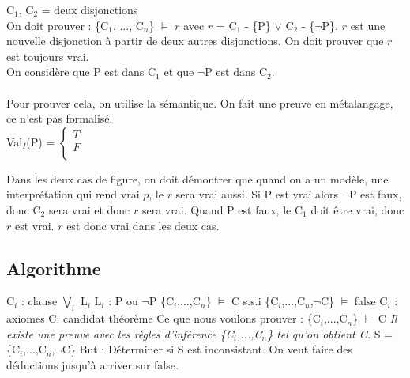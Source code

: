 \noindent C$_{1}$, C$_{2}$ = deux disjonctions \\

\noindent On doit prouver : \{C$_{1}$, ..., C$_{n}$\} $\models$ $r$ avec  $r$ = C$_{1}$ - \{P\} $\lor$ C$_{2}$ - \{$\lnot$P\}. $r$ est une nouvelle disjonction à partir de deux autres disjonctions. On doit prouver que $r$ est toujours vrai.\\

\noindent On considère que P est dans C$_{1}$ et que $\lnot$P est dans C$_{2}$.\\
\\
Pour prouver cela, on utilise la sémantique. On fait une preuve en métalangage, ce n'est pas formalisé. \\
Val$_{I}$(P) =
$\left\lbrace
\begin{array}{l}
T \\
F \\
\end{array}
\right.$ 

Dans les deux cas de figure, on doit démontrer que quand on a un modèle, une interprétation qui rend vrai $p$, le $r$ sera vrai aussi. Si P est vrai alors $\lnot$P est faux, donc C$_{2}$ sera vrai et donc $r$ sera vrai. Quand P est faux, le C$_{1}$ doit être vrai, donc $r$ est vrai. $r$ est donc vrai dans les deux cas. 

\subsection{Algorithme}

\noindent C$_{i}$ : clause $\bigvee\limits_{i}$ L$_{i}$ \newline
L$_{i}$ : P ou $\lnot$P \newline
\{C$_{i}$,...,C$_{n}$\} $\models$ C \newline
s.s.i \newline
\{C$_{i}$,...,C$_{n}$,$\lnot$C\} $\models$ false \newline
C$_{i}$ : axiomes \newline
C: candidat théorème \newline
Ce que nous voulons prouver : \{C$_{i}$,...,C$_{n}$\} $\vdash$ C \newline
\noindent \emph{Il existe une preuve avec les règles d'inférence \{C$_{i}$,...,C$_{n}$\} tel qu'on obtient C.} \newline
S = \{C$_{i}$,...,C$_{n}$,$\lnot$C\} \newline
But : Déterminer si S est inconsistant. On veut faire des déductions jusqu'à arriver sur false. 

